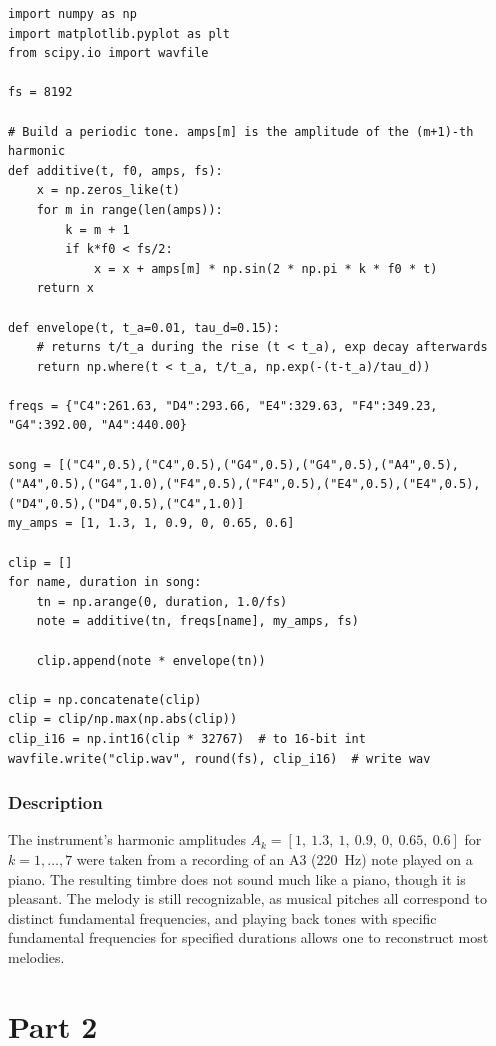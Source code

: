 \documentclass[11pt, a4paper]{article}
\begin{document}
\begin{lstlisting}[style=python]
import numpy as np
import matplotlib.pyplot as plt
from scipy.io import wavfile

fs = 8192

# Build a periodic tone. amps[m] is the amplitude of the (m+1)-th harmonic
def additive(t, f0, amps, fs):
    x = np.zeros_like(t)
    for m in range(len(amps)):
        k = m + 1
        if k*f0 < fs/2:
            x = x + amps[m] * np.sin(2 * np.pi * k * f0 * t)
    return x

def envelope(t, t_a=0.01, tau_d=0.15):
    # returns t/t_a during the rise (t < t_a), exp decay afterwards
    return np.where(t < t_a, t/t_a, np.exp(-(t-t_a)/tau_d))

freqs = {"C4":261.63, "D4":293.66, "E4":329.63, "F4":349.23, "G4":392.00, "A4":440.00}

song = [("C4",0.5),("C4",0.5),("G4",0.5),("G4",0.5),("A4",0.5),("A4",0.5),("G4",1.0),("F4",0.5),("F4",0.5),("E4",0.5),("E4",0.5),("D4",0.5),("D4",0.5),("C4",1.0)]
my_amps = [1, 1.3, 1, 0.9, 0, 0.65, 0.6]

clip = []
for name, duration in song:
    tn = np.arange(0, duration, 1.0/fs)
    note = additive(tn, freqs[name], my_amps, fs)

    clip.append(note * envelope(tn))

clip = np.concatenate(clip)
clip = clip/np.max(np.abs(clip))
clip_i16 = np.int16(clip * 32767)  # to 16-bit int
wavfile.write("clip.wav", round(fs), clip_i16)  # write wav
\end{lstlisting}

\subsubsection*{Description}
The instrument's harmonic amplitudes $A_k = [1,\ 1.3,\ 1,\ 0.9,\ 0,\ 0.65,\ 0.6]$ for $k = 1, \ldots, 7$ were taken from a recording of an A3 (\SI{220}{\hertz}) note played on a piano. The resulting timbre does not sound much like a piano, though it is pleasant. The melody is still recognizable, as musical pitches all correspond to distinct fundamental frequencies, and playing back tones with specific fundamental frequencies for specified durations allows one to reconstruct most melodies.
\newpage
\section*{Part 2}
\end{document}
